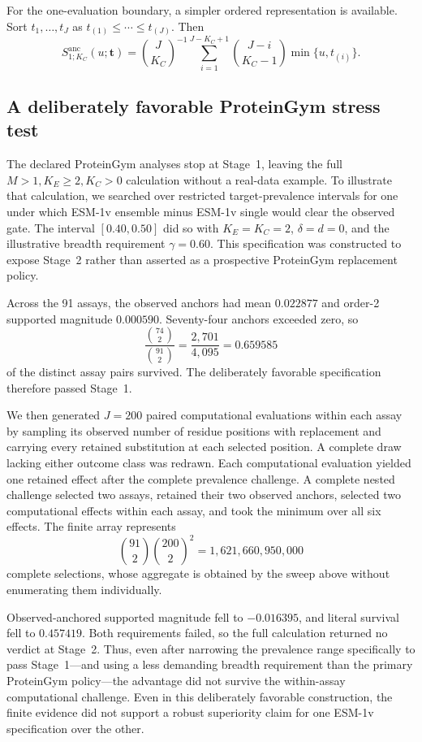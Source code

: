 \documentclass[11pt]{article}
\newcommand{\Sanc}{S^{\mathrm{anc}}}
\theoremstyle{remark}
\begin{document}
For the one-evaluation boundary, a simpler ordered representation is available.
Sort $t_1,\ldots,t_J$ as $t_{(1)}\leq\cdots\leq t_{(J)}$. Then
\begin{equation}
\Sanc_{1;K_C}(u;\mathbf t)
=
\binom{J}{K_C}^{-1}
\sum_{i=1}^{J-K_C+1}
\binom{J-i}{K_C-1}
\min\{u,t_{(i)}\}.
\label{eq:one-row-sorted}
\end{equation}

\subsection{A deliberately favorable ProteinGym stress test}
\label{app:proteingym-nested}

The declared ProteinGym analyses stop at Stage~1, leaving the full
$M>1,K_E\geq2,K_C>0$ calculation without a real-data example. To illustrate
that calculation, we searched over restricted target-prevalence intervals for
one under which ESM-1v ensemble minus ESM-1v single would clear the observed
gate. The interval $[0.40,0.50]$ did so with $K_E=K_C=2$, $\delta=d=0$, and
the illustrative breadth requirement $\gamma=0.60$. This specification was
constructed to expose Stage~2 rather than asserted as a prospective
ProteinGym replacement policy.

Across the 91 assays, the observed anchors had mean $0.022877$ and order-2
supported magnitude $0.000590$. Seventy-four anchors exceeded zero, so
\[
\frac{\binom{74}{2}}{\binom{91}{2}}
=
\frac{2{,}701}{4{,}095}
=
0.659585
\]
of the distinct assay pairs survived. The deliberately favorable
specification therefore passed Stage~1.

We then generated $J=200$ paired computational evaluations within each assay
by sampling its observed number of residue positions with replacement and
carrying every retained substitution at each selected position. A complete
draw lacking either outcome class was redrawn. Each computational evaluation
yielded one retained effect after the complete prevalence challenge. A
complete nested challenge selected two assays, retained their two observed
anchors, selected two computational effects within each assay, and took the
minimum over all six effects. The finite array represents
\[
\binom{91}{2}\binom{200}{2}^{2}
=1{,}621{,}660{,}950{,}000
\]
complete selections, whose aggregate is obtained by the sweep above without
enumerating them individually.

Observed-anchored supported magnitude fell to $-0.016395$, and literal
survival fell to $0.457419$. Both requirements failed, so the full calculation
returned no verdict at Stage~2. Thus, even after narrowing the prevalence
range specifically to pass Stage~1---and using a less demanding breadth
requirement than the primary ProteinGym policy---the advantage did not survive
the within-assay computational challenge. Even in this deliberately favorable
construction, the finite evidence did not support a robust superiority claim
for one ESM-1v specification over the other.
\end{document}
